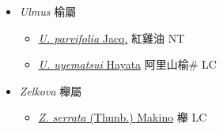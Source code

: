 
  \begin{itemize}
 \item[] \textit{Ulmus} 榆屬
                    
  \begin{itemize}
        \item[] \href{http://www.theplantlist.org/tpl1.1/search?q=Ulmus+parvifolia}{\textit{U. parvifolia} Jacq.}   紅雞油 NT
        \item[] \href{http://www.theplantlist.org/tpl1.1/search?q=Ulmus+uyematsui}{\textit{U. uyematsui} Hayata}   阿里山榆\# LC
  \end{itemize}
 \item[] \textit{Zelkova} 櫸屬
                    
  \begin{itemize}
        \item[] \href{http://www.theplantlist.org/tpl1.1/search?q=Zelkova+serrata}{\textit{Z. serrata} (Thunb.) Makino}   櫸 LC
  \end{itemize}
  \end{itemize}
